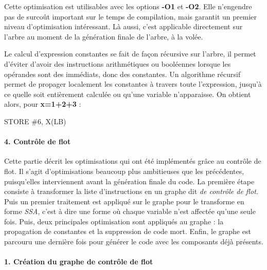 \documentclass[
]{article}
\newenvironment{Shaded}{}{}
\newcommand{\NormalTok}[1]{#1}
\begin{document}
Cette optimisation est utilisables avec les options \textbf{-O1} et
\textbf{-O2}. Elle n'engendre pas de surcoût important sur le temps de
compilation, mais garantit un premier niveau d'optimisation intéressant.
Là aussi, c'est applicable directement sur l'arbre au moment de la
génération finale de l'arbre, à la volée.

Le calcul d'expression constantes se fait de façon récursive sur
l'arbre, il permet d'éviter d'avoir des instructions arithmétiques ou
booléennes lorsque les opérandes sont des immédiats, donc des
constantes. Un algorithme récursif permet de propager localement les
constantes à travers toute l'expression, jusqu'à ce quelle soit
entièrement calculée ou qu'une variable n'apparaisse. On obtient alors,
pour \textbf{x=1+2+3} :

\begin{Shaded}
\begin{Highlighting}[]
\NormalTok{STORE \#6, X(LB)}
\end{Highlighting}
\end{Shaded}

\hypertarget{4-contruxf4le-de-flot}{%
\paragraph{\texorpdfstring{4. Contrôle de flot
}{4. Contrôle de flot }}\label{4-contruxf4le-de-flot}}

Cette partie décrit les optimisations qui ont été implémentés grâce au
contrôle de flot. Il s'agit d'optimisations beaucoup plus ambitieuses
que les précédentes, puisqu'elles interviennent avant la génération
finale du code. La première étape consiste à transformer la liste
d'instructions en un graphe dit \emph{de contrôle de flot}. Puis un
premier traitement est appliqué sur le graphe pour le transforme en
forme \emph{SSA}, c'est à dire une forme où chaque variable n'est
affectée qu'une seule fois. Puis, deux principales optimisation sont
appliqués au graphe : la propagation de constantes et la suppression de
code mort. Enfin, le graphe est parcouru une dernière fois pour générer
le code avec les composants déjà présents.

\hypertarget{1-cruxe9ation-du-graphe-de-contruxf4le-de-flot}{%
\paragraph{1. Création du graphe de contrôle de
flot}\label{1-cruxe9ation-du-graphe-de-contruxf4le-de-flot}}
\end{document}
